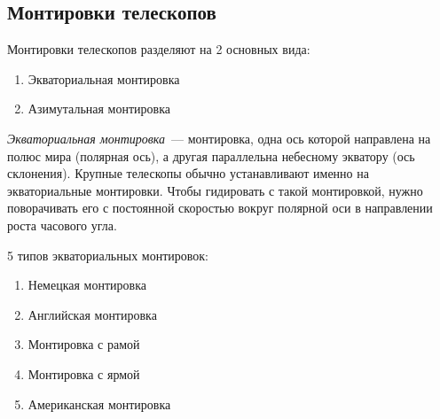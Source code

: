 \subsection{Монтировки телескопов}

Монтировки телескопов разделяют на 2 основных вида:
\begin{enumerate}
\item Экваториальная монтировка
\item Азимутальная монтировка
\end{enumerate}

\textit{Экваториальная монтировка}~--- монтировка, одна ось которой направлена на полюс мира (полярная ось), а другая параллельна небесному экватору (ось склонения). Крупные телескопы обычно устанавливают именно на экваториальные монтировки. Чтобы гидировать с такой монтировкой, нужно поворачивать его с постоянной скоростью вокруг полярной оси в направлении роста часового угла.

5 типов экваториальных монтировок:
\begin{enumerate}
\item Немецкая монтировка
\item Английская монтировка
\item Монтировка с рамой
\item Монтировка с ярмой
\item Американская монтировка
\end{enumerate}